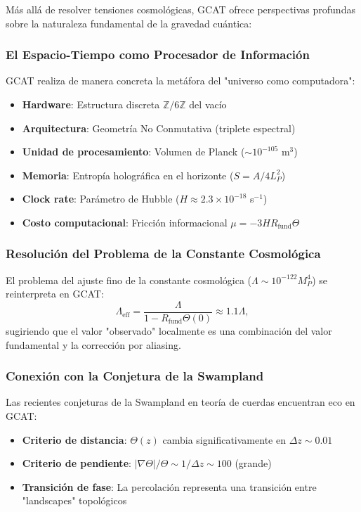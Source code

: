 \documentclass[12pt, a4paper]{article}
\theoremstyle{plain}
\theoremstyle{definition}
\begin{document}
Más allá de resolver tensiones cosmológicas, GCAT ofrece perspectivas profundas sobre la naturaleza fundamental de la gravedad cuántica:

\subsubsection{El Espacio-Tiempo como Procesador de Información}

GCAT realiza de manera concreta la metáfora del "universo como computadora":
\begin{itemize}
    \item \textbf{Hardware}: Estructura discreta $\mathbb{Z}/6\mathbb{Z}$ del vacío
    \item \textbf{Arquitectura}: Geometría No Conmutativa (triplete espectral)
    \item \textbf{Unidad de procesamiento}: Volumen de Planck ($\sim 10^{-105}$ m$^3$)
    \item \textbf{Memoria}: Entropía holográfica en el horizonte ($S = A/4L_P^2$)
    \item \textbf{Clock rate}: Parámetro de Hubble ($H \approx 2.3 \times 10^{-18}$ s$^{-1}$)
    \item \textbf{Costo computacional}: Fricción informacional $\mu = -3H R_{\mathrm{fund}}\Theta$
\end{itemize}

\subsubsection{Resolución del Problema de la Constante Cosmológica}

El problema del ajuste fino de la constante cosmológica ($\Lambda \sim 10^{-122} M_P^4$) se reinterpreta en GCAT:
\begin{equation}
\Lambda_{\mathrm{eff}} = \frac{\Lambda}{1 - R_{\mathrm{fund}}\Theta(0)} \approx 1.1\Lambda,
\end{equation}
sugiriendo que el valor "observado" localmente es una combinación del valor fundamental y la corrección por aliasing.

\subsubsection{Conexión con la Conjetura de la Swampland}

Las recientes conjeturas de la Swampland en teoría de cuerdas \cite{Palti2019} encuentran eco en GCAT:
\begin{itemize}
    \item \textbf{Criterio de distancia}: $\Theta(z)$ cambia significativamente en $\Delta z \sim 0.01$
    \item \textbf{Criterio de pendiente}: $|\nabla\Theta|/\Theta \sim 1/\Delta z \sim 100$ (grande)
    \item \textbf{Transición de fase}: La percolación representa una transición entre "landscapes" topológicos
\end{itemize}
\end{document}
